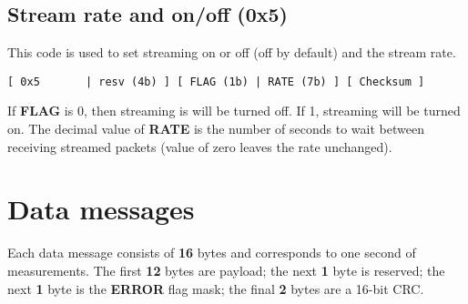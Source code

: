 \documentclass[11pt]{article}
\begin{document}
\subsection{Stream rate and on/off (0x5)}
This code is used to set streaming on or off (off by default) and the stream rate.
\begin{verbatim}
[ 0x5       | resv (4b) ] [ FLAG (1b) | RATE (7b) ] [ Checksum ]
\end{verbatim}
If \textbf{FLAG} is 0, then streaming is will be turned off. If 1, streaming will be turned on. The decimal value of \textbf{RATE} is the number of seconds to wait between receiving streamed packets (value of zero leaves the rate unchanged).

\section{Data messages}
Each data message consists of \textbf{16} bytes and corresponds to one second of measurements. The first \textbf{12} bytes are payload; the next \textbf{1} byte is reserved; the next \textbf{1} byte is the \textbf{ERROR} flag mask; the final \textbf{2} bytes are a 16-bit CRC.
\end{document}
